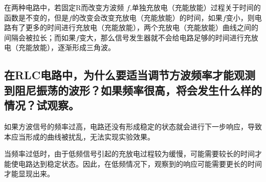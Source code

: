 \documentclass{ctexart}
\begin{document}
在两种电路中，若固定R而改变方波频 $f$,单独充放电（充能放能）过程关于时间的函数是不变的，但是$f$的改变会改变充放电（充能放能）的时间，如果$f$变小，则电路有了更多的时间进行充放电（充能放能），两个充放电（充能放能）曲线之间的间隔会被拉长；而如果$f$变大，那么信号发生器就不会给电路足够的时间进行充放电（充能放能），逐渐形成三角波。

\subsection{在RLC电路中，为什么要适当调节方波频率才能观测到阻尼振荡的波形？如果频率很高，将会发生什么样的情况？试观察。}


如果方波信号的频率过高，电路还没有形成稳定的状态就会进行下一步响应，导致本应当形成的曲线被扰乱，无法实现实验效果。

当频率过低时，由于低频信号引起的充放电过程较为缓慢，可能需要较长的时间才能使电路达到稳定状态。因此，在低频情况下，观察到的响应可能需要更长的时间才能显现出来。
\end{document}
